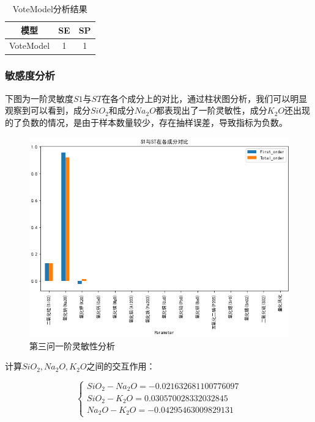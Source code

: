 \documentclass[UTF8]{ctexart}
\begin{document}
\begin{table}[H]
    \centering
    \caption{VoteModel分析结果}
    \begin{tabular}{|c|c|c|}
        \hline
        模型      & SE & SP \\ \hline
        VoteModel & 1  & 1  \\ \hline
    \end{tabular}
\end{table}
\subsubsection{敏感度分析}
下图为一阶灵敏度$S1$与$ST$在各个成分上的对比，通过柱状图分析，我们可以明显观察到可以看到，成分$SiO_2$和成分$Na_2O$都表现出了一阶灵敏性，成分$K_2O$还出现的了负数的情况，是由于样本数量较少，存在抽样误差，导致指标为负数。

\begin{figure}[H]\centering
    \includegraphics[width=1\textwidth,height=0.7\textwidth]{img/S1_2.png} %
    \caption{第三问一阶灵敏性分析} %
    \label{fig:figure 9} %
\end{figure}

计算$SiO_2,Na_2O,K_2O$之间的交互作用：

\[\left\{\begin{array}{llcl}
        SiO_2-Na_2O = -0.021632681100776097 \\
        SiO_2-K_2O =	0.030570028332032845    \\
        Na_2O-K_2O =-0.04295463009829131
    \end{array} \right.\]


\end{document}
